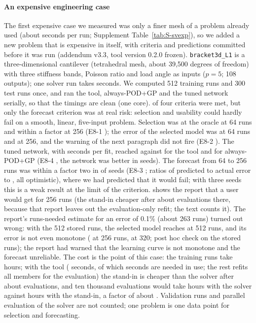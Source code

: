 \paragraph{An expensive engineering case} The first expensive case we measured was only a finer mesh of a problem already used (about \SvETsim{} seconds per run; Supplement Table~\ref{tab:S-svexp}), so we added a new problem that is expensive in itself, with criteria and predictions committed before it was run (addendum v3.3, tool version 0.2.0 frozen). \texttt{bracket3d\_L1} is a three-dimensional cantilever (tetrahedral mesh, about 39,500 degrees of freedom) with three stiffness bands, Poisson ratio and load angle as inputs ($p=5$; 108 outputs); one solver run takes \SeTsim{} seconds. We computed 512 training runs and 300 test runs once, and ran the tool, always-POD+GP and the tuned network serially, so that the timings are clean (one core). \SeMetCount{} of four criteria were met, but only the forecast criterion was at real risk: selection and usability could hardly fail on a smooth, linear, five-input problem. Selection was at the oracle at 64 runs and within a factor \SeOneRegretTwoFiveSix{} at 256 (E8-1 \SeOneVerdict); the error of the selected model was \SeErrSixtyfour{} at 64 runs and \SeErrTwofiftysix{} at 256, and the warning of the next paragraph did not fire (E8-2 \SeTwoVerdict). The tuned network, with \SeNetSec{} seconds per fit, reached \SeNetErr{} against \SeErrTwofiftysix{} for the tool and \SeGpErr{} for always-POD+GP (E8-4 \SeFourVerdict, the network was better in \SeFourK{} seeds). The forecast from 64 to 256 runs was within a factor two in \SeThreeK{} of \SeThreeN{} seeds (E8-3 \SeThreeVerdict; ratios of predicted to actual error \SeRatioMin{} to \SeRatioMax{}, all optimistic), where we had predicted that it would fail; with three seeds this is a weak result at the limit of the criterion.  shows the report that a user would get for 256 runs (the stand-in cheaper after about \SeBreakWithout{} evaluations there, because that report leaves out the evaluation-only refit; the text counts it). The report's runs-needed estimate for an error of 0.1\% (about 263 runs) turned out wrong: with the 512 stored runs, the selected model reaches \SeRnEnd{} at 512 runs, and its error is not even monotone (\SeRnStart{} at 256 runs, \SeRnMid{} at 320; post hoc check on the stored runs); the report had warned that the learning curve is not monotone and the forecast unreliable. The cost is the point of this case: the training runs take \SeSimhTwofiftysix{} hours; with the tool (\SeToolsecWith{} seconds, of which \SeToolsecWithout{} seconds are needed in use; the rest refits all members for the evaluation) the stand-in is cheaper than the solver after about \SeBreakWith{} evaluations, and ten thousand evaluations would take \SeSolverH{} hours with the solver against \SeSurrH{} hours with the stand-in, a factor of about \SeSpeedup. Validation runs and parallel evaluation of the solver are not counted; one problem is one data point for selection and forecasting.
